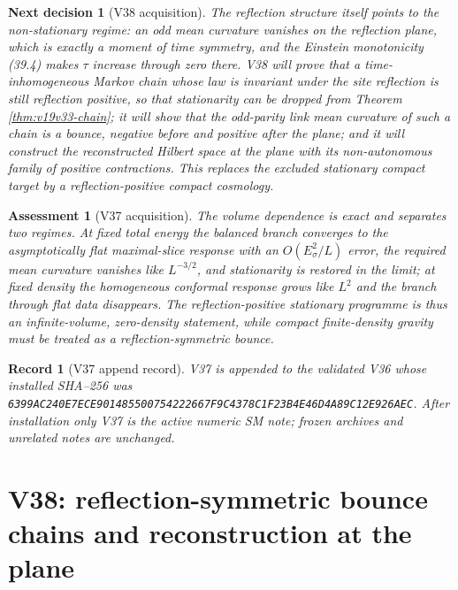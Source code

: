 \documentclass[11pt]{article}
\newtheorem{decision}[theorem]{Next decision}
\newtheorem{assessment}[theorem]{Assessment}
\newtheorem{record}[theorem]{Record}
\theoremstyle{remark}
\begin{document}
\begin{decision}[V38 acquisition]
\label{dec:v19v37-next}
The reflection structure itself points to the non-stationary regime:
an odd mean curvature vanishes on the reflection plane, which is exactly
a moment of time symmetry, and the Einstein monotonicity (39.4) makes
\(\tau\) increase through zero there.  V38 will prove that a
time-inhomogeneous Markov chain whose law is invariant under the site
reflection is still reflection positive, so that stationarity can be
dropped from Theorem \ref{thm:v19v33-chain}; it will show that the
odd-parity link mean curvature of such a chain is a bounce, negative
before and positive after the plane; and it will construct the
reconstructed Hilbert space at the plane with its non-autonomous family
of positive contractions.  This replaces the excluded stationary
compact target by a reflection-positive compact cosmology.
\end{decision}

\begin{assessment}[V37 acquisition]
\label{ass:v19v37}
The volume dependence is exact and separates two regimes.  At fixed
total energy the balanced branch converges to the asymptotically flat
maximal-slice response with an \(O(E_\sigma^2/L)\) error, the required
mean curvature vanishes like \(L^{-3/2}\), and stationarity is restored
in the limit; at fixed density the homogeneous conformal response grows
like \(L^2\) and the branch through flat data disappears.  The
reflection-positive stationary programme is thus an infinite-volume,
zero-density statement, while compact finite-density gravity must be
treated as a reflection-symmetric bounce.
\end{assessment}

\begin{record}[V37 append record]
\label{rec:v19v37}
V37 is appended to the validated V36 whose installed SHA--256 was
\texttt{6399AC240E7ECE901485500754222667F9C4378C1F23B4E46D4A89C12E926AEC}.
After installation only V37 is the active numeric SM note; frozen
archives and unrelated notes are unchanged.
\end{record}


\section{V38: reflection-symmetric bounce chains and reconstruction at the plane}
\label{sec:v19v38}
\end{document}
